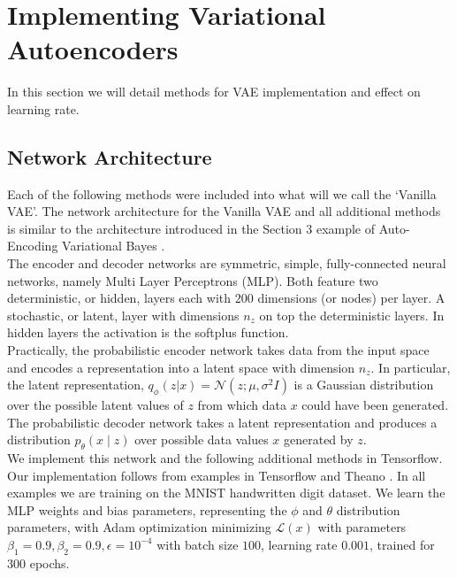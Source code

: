 \documentclass{article} %
\renewcommand{\L}{\mathcal{L}}
\begin{document}
 

\section{Implementing Variational Autoencoders}
In this section we will detail methods for VAE implementation and effect on learning rate.\\
\subsection{Network Architecture}
Each of the following methods were included into what will we call the `Vanilla VAE'. The network architecture for the Vanilla VAE and all additional methods is similar to the architecture introduced in the Section $3$ example of Auto-Encoding Variational Bayes \cite{Kingma2013}.\\
The encoder and decoder networks are symmetric, simple, fully-connected neural networks, namely Multi Layer Perceptrons (MLP). Both feature two deterministic, or hidden, layers each with $200$ dimensions (or nodes) per layer. A stochastic, or latent, layer with dimensions $n_z$ on top the deterministic layers. In hidden layers the activation is the softplus function.\\
Practically, the probabilistic encoder network takes data from the input space and encodes a representation into a latent space with dimension $n_z$. In particular, the latent representation, $q_\phi(z|x)=\mathcal{N}(z;\mu,\sigma^2 I)$ is a Gaussian distribution over the possible latent values of $z$ from which data $x$ could have been generated. The probabilistic decoder network takes a latent representation and produces a distribution ${p_\theta(x\mid z)}$ over possible data values $x$ generated by $z$.\\
We implement this network and the following additional methods in Tensorflow. Our implementation follows from examples in Tensorflow and Theano \cite{Sonderby,Metzen2015,Ahuja}. In all examples we are training on the MNIST handwritten digit dataset. We learn the MLP weights and bias parameters, representing the $\phi$ and $\theta$ distribution parameters, with Adam optimization minimizing $\L(x)$ with parameters $\beta_1 = 0.9, \beta_2 = 0.9, \epsilon = 10^{-4}$ with batch size $100$, learning rate $0.001$, trained for $300$ epochs.
\end{document}
